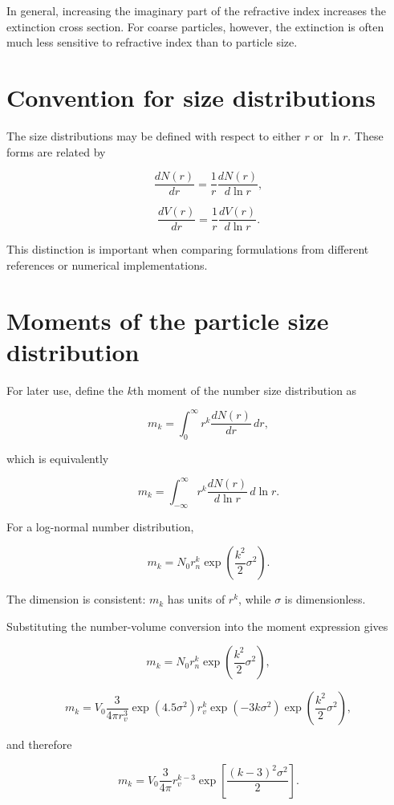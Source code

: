 \documentclass[
  11pt,
  letterpaper,
  DIV=11,
  numbers=noendperiod]{scrreprt}
\begin{document}
In general, increasing the imaginary part of the refractive index
increases the extinction cross section. For coarse particles, however,
the extinction is often much less sensitive to refractive index than to
particle size.

\section{Convention for size
distributions}\label{convention-for-size-distributions}

The size distributions may be defined with respect to either \(r\) or
\(\ln r\). These forms are related by

\[
\frac{d N(r)}{d r}=\frac{1}{r}\frac{d N(r)}{d \ln r},
\]

\[
\frac{d V(r)}{d r}=\frac{1}{r}\frac{d V(r)}{d \ln r}.
\]

This distinction is important when comparing formulations from different
references or numerical implementations.

\section{Moments of the particle size
distribution}\label{moments-of-the-particle-size-distribution}

For later use, define the \(k\)th moment of the number size distribution
as

\[
m_k=\int_{0}^{\infty} r^k \frac{d N(r)}{d r} \, d r,
\]

which is equivalently

\[
m_k=\int_{-\infty}^{\infty} r^k \frac{d N(r)}{d \ln r} \, d \ln r.
\]

For a log-normal number distribution,

\[
m_k=N_0 r_n^k \exp\left(\frac{k^2}{2} \sigma^2\right).
\]

The dimension is consistent: \(m_k\) has units of \(r^k\), while
\(\sigma\) is dimensionless.

Substituting the number-volume conversion into the moment expression
gives

\[
m_k=N_0 r_n^k \exp\left(\frac{k^2}{2} \sigma^2\right),
\]

\[
m_k=V_{0} \frac{3}{4 \pi r_{v}^3}\exp(4.5 \sigma^2)r^k_{v} \exp(-3k \sigma^2) \exp\left(\frac{k^2}{2} \sigma^2\right),
\]

and therefore

\[
m_k=V_{0} \frac{3}{4 \pi} r^{k-3}_v\exp\left[\frac{(k-3)^2\sigma^2}{2} \right].
\]
\end{document}
